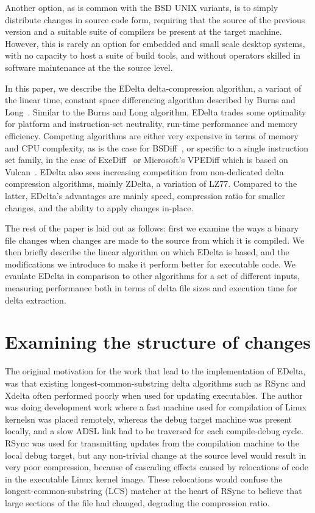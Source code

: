 \documentclass[10pt,twocolumn]{article}
\begin{document}
Another option, as is common with the BSD UNIX variants, is to simply distribute
changes in source code form, requiring that the source of the previous version
and a suitable suite of compilers be present at the target machine.  However,
this is rarely an option for embedded and small scale desktop systems, with no
capacity to host a suite of build tools, and without operators skilled in
software maintenance at the the source level.

In this paper, we describe the EDelta delta-compression algorithm, a variant of
the linear time, constant space differencing algorithm described by Burns and
Long~\cite{lineartime}. Similar to the Burns and Long algorithm, EDelta trades
some optimality for platform and instruction-set neutrality, run-time
performance and memory efficiency. Competing algorithms are either very
expensive in terms of memory and CPU complexity, as is the case for
BSDiff~\cite{bsdiff}, or specific to a single instruction set family, in the
case of ExeDiff~\cite{exediff} or Microsoft's VPEDiff which is based on
Vulcan~\cite{vulcan}. EDelta also sees increasing competition from non-dedicated
delta compression algorithms, mainly ZDelta, a variation of LZ77. Compared to
the latter, EDelta's advantages are mainly speed, compression ratio for smaller
changes, and the ability to apply changes in-place.

The rest of the paper is laid out as follows: first we examine the ways a binary
file changes when changes are made to the source from which it is compiled. We
then briefly describe the linear algorithm on which EDelta is based, and the
modifications we introduce to make it perform better for executable code. We
evaulate EDelta in comparison to other algorithms for a set of different inputs,
measuring performance both in terms of delta file sizes and execution time for
delta extraction.

\section{Examining the structure of changes}

The original motivation for the work that lead to the implementation of EDelta,
was that existing longest-common-substring delta algorithms such as RSync and
Xdelta often performed poorly when used for updating executables. The author was
doing development work where a fast machine used for compilation of Linux
kernelsn was placed remotely, whereas the debug target machine was present
locally, and a slow ADSL link had to be traversed for each compile-debug cycle.
RSync was used for transmitting updates from the compilation machine to the
local debug target, but any non-trivial change at the source level would result
in very poor compression, because of cascading effects caused by relocations of
code in the executable Linux kernel image. These relocations would confuse the
longest-common-substring (LCS) matcher at the heart of RSync to believe that
large sections of the file had changed, degrading the compression ratio.
\end{document}
